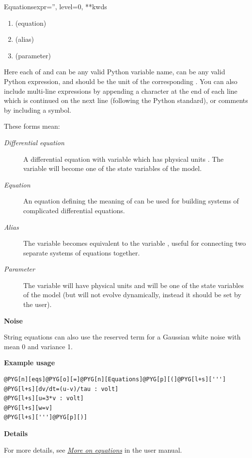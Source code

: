 \documentclass[letterpaper,10pt,english]{manual}
\begin{document}
\begin{classdesc}{Equations}{expr='', level=0, **kwds}
\begin{enumerate}
\item {} 
 (equation)

\item {} 
 (alias)

\item {} 
 (parameter)

\end{enumerate}

Here each of  and  can be any valid Python variable name,
 can be any valid Python expression, and  should be the
unit of the corresponding . You can also include multi-line
expressions by appending a \code{\textbackslash{}} character at the end of each line
which is continued on the next line (following the Python standard),
or comments by including a \code{\#} symbol.

These forms mean:
\begin{description}
\item[\emph{Differential equation}] \leavevmode
A differential equation with variable  which has physical
units . The variable  will become one of the state
variables of the model.

\item[\emph{Equation}] \leavevmode
An equation defining the meaning of  can be used for building
systems of complicated differential equations.

\item[\emph{Alias}] \leavevmode
The variable  becomes equivalent to the variable , useful
for connecting two separate systems of equations together.

\item[\emph{Parameter}] \leavevmode
The variable  will have physical units  and will be
one of the state variables of the model (but will not evolve
dynamically, instead it should be set by the user).

\end{description}
\textbf{Noise}

String equations can also use the reserved term  for a
Gaussian white noise with mean 0 and variance 1.

\textbf{Example usage}

\begin{Verbatim}[commandchars=@\[\]]
@PYG[n][eqs]@PYG[o][=]@PYG[n][Equations]@PYG[p][(]@PYG[l+s][''']
@PYG[l+s][dv/dt=(u-v)/tau : volt]
@PYG[l+s][u=3*v : volt]
@PYG[l+s][w=v]
@PYG[l+s][''']@PYG[p][)]
\end{Verbatim}

\textbf{Details}

For more details, see \hyperlink{moreonequations}{\emph{More on equations}} in the user manual.
\end{classdesc}
\end{document}
